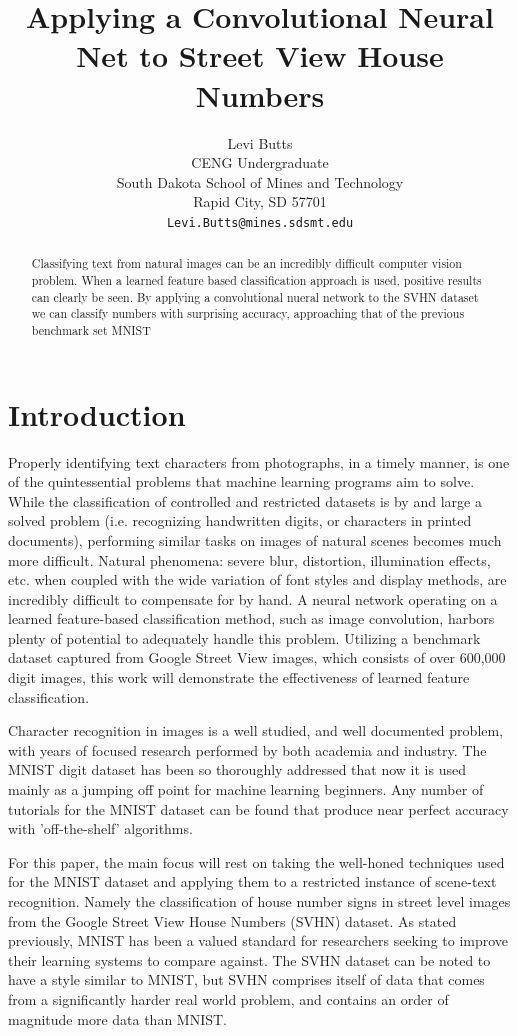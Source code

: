 \documentclass{article}
\title{Applying a Convolutional Neural Net to Street View House Numbers}
\author{
	Levi Butts\\
	CENG Undergraduate\\
	South Dakota School of Mines and Technology\\
	Rapid City, SD 57701 \\
	\texttt{Levi.Butts@mines.sdsmt.edu} \\
}
\begin{document}
	
	\maketitle
	
	\begin{abstract}
		Classifying text from natural images can be an incredibly difficult computer vision problem. When a learned feature based classification approach is used, positive results can clearly be seen. By applying a convolutional nueral network to the SVHN dataset we can classify numbers with surprising accuracy, approaching that of the previous benchmark set MNIST
	\end{abstract}
	
	\section{Introduction}
	
	Properly identifying text characters from photographs, in a timely manner, is one of the quintessential problems that machine learning programs aim to solve.  While the classification of controlled and restricted datasets is by and large a solved problem (i.e. recognizing handwritten digits, or characters in printed documents), performing similar tasks on images of natural scenes becomes much more difficult.  Natural phenomena: severe blur, distortion, illumination effects, etc. when coupled with the wide variation of font styles and display methods, are incredibly difficult to compensate for by hand.  A neural network operating on a learned feature-based classification method, such as image convolution, harbors plenty of potential to adequately handle this problem.   Utilizing a benchmark dataset captured from Google Street View images, which consists of over 600,000 digit images, this work will demonstrate the effectiveness of learned feature classification.
	
	Character recognition in images is a well studied, and well documented problem, with years of focused research performed by both academia and industry.  The MNIST digit dataset has been so thoroughly addressed that now it is used mainly as a jumping off point for machine learning beginners.  Any number of tutorials for the MNIST dataset can be found that produce near perfect accuracy with 'off-the-shelf' algorithms.  
	
	For this paper, the main focus will rest on taking the well-honed techniques used for the MNIST dataset and applying them to a restricted instance of scene-text recognition.  Namely the classification of house number signs in street level images from the Google Street View House Numbers (SVHN) dataset.  As stated previously, MNIST has been a valued standard for researchers seeking to improve their learning systems to compare against.  The SVHN dataset can be noted to have a style similar to MNIST, but SVHN comprises itself of data that comes from a significantly harder real world problem, and contains an order of magnitude more data than MNIST.
	
\end{document}
